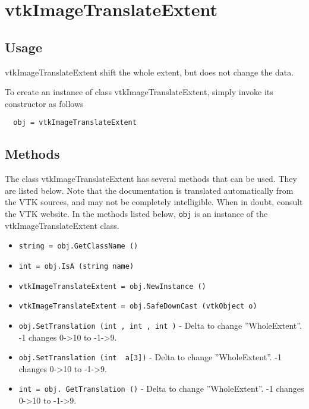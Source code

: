 \section{vtkImageTranslateExtent}

\subsection{Usage}

 vtkImageTranslateExtent  shift the whole extent, but does not
 change the data.

To create an instance of class vtkImageTranslateExtent, simply
invoke its constructor as follows
\begin{verbatim}
  obj = vtkImageTranslateExtent
\end{verbatim}
\subsection{Methods}

The class vtkImageTranslateExtent has several methods that can be used.
  They are listed below.
Note that the documentation is translated automatically from the VTK sources,
and may not be completely intelligible.  When in doubt, consult the VTK website.
In the methods listed below, \verb|obj| is an instance of the vtkImageTranslateExtent class.
\begin{itemize}
\item  \verb|string = obj.GetClassName ()|

\item  \verb|int = obj.IsA (string name)|

\item  \verb|vtkImageTranslateExtent = obj.NewInstance ()|

\item  \verb|vtkImageTranslateExtent = obj.SafeDownCast (vtkObject o)|

\item  \verb|obj.SetTranslation (int , int , int )| -  Delta to change ''WholeExtent''. -1 changes 0->10 to -1->9.

\item  \verb|obj.SetTranslation (int  a[3])| -  Delta to change ''WholeExtent''. -1 changes 0->10 to -1->9.

\item  \verb|int = obj. GetTranslation ()| -  Delta to change ''WholeExtent''. -1 changes 0->10 to -1->9.

\end{itemize}
